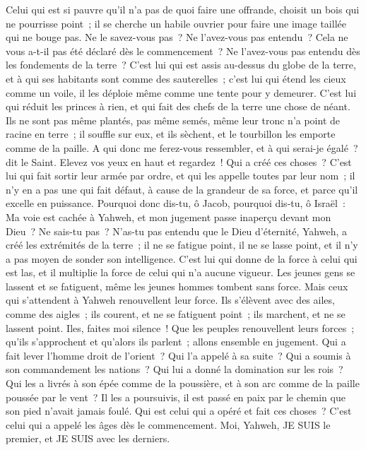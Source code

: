 \begin{multicols}{2}
Celui qui est si pauvre qu'il n'a pas de quoi faire une offrande, choisit un bois qui ne pourrisse point~; il se cherche un habile ouvrier pour faire une image taillée qui ne bouge pas.
Ne le savez-vous pas~? Ne l'avez-vous pas entendu~? Cela ne vous a-t-il pas été déclaré dès le commencement~? Ne l'avez-vous pas entendu dès les fondements de la terre~?
C'est lui qui est assis au-dessus du globe de la terre, et à qui ses habitants sont comme des sauterelles~; c'est lui qui étend les cieux comme un voile, il les déploie même comme une tente pour y demeurer.
C'est lui qui réduit les princes à rien, et qui fait des chefs de la terre une chose de néant.
Ils ne sont pas même plantés, pas même semés, même leur tronc n'a point de racine en terre~; il souffle sur eux, et ils sèchent, et le tourbillon les emporte comme de la paille.
A qui donc me ferez-vous ressembler, et à qui serai-je égalé~? dit le Saint.
Elevez vos yeux en haut et regardez~! Qui a créé ces choses~? C'est lui qui fait sortir leur armée par ordre, et qui les appelle toutes par leur nom~; il n'y en a pas une qui fait défaut, à cause de la grandeur de sa force, et parce qu'il excelle en puissance.
Pourquoi donc dis-tu, ô Jacob, pourquoi dis-tu, ô Israël~: Ma voie est cachée à Yahweh, et mon jugement passe inaperçu devant mon Dieu~?
Ne sais-tu pas~? N'as-tu pas entendu que le Dieu d'éternité, Yahweh, a créé les extrémités de la terre~; il ne se fatigue point, il ne se lasse point, et il n'y a pas moyen de sonder son intelligence.
C'est lui qui donne de la force à celui qui est las, et il multiplie la force de celui qui n'a aucune vigueur.
Les jeunes gens se lassent et se fatiguent, même les jeunes hommes tombent sans force.
Mais ceux qui s'attendent à Yahweh renouvellent leur force. Ils s'élèvent avec des ailes, comme des aigles~; ils courent, et ne se fatiguent point~; ils marchent, et ne se lassent point.
\VerseOne{}Iles, faites moi silence~! Que les peuples renouvellent leurs forces~; qu'ils s'approchent et qu'alors ils parlent~; allons ensemble en jugement.
Qui a fait lever l'homme droit de l'orient~? Qui l'a appelé à sa suite~? Qui a soumis à son commandement les nations~? Qui lui a donné la domination sur les rois~? Qui les a livrés à son épée comme de la poussière, et à son arc comme de la paille poussée par le vent~?
Il les a poursuivis, il est passé en paix par le chemin que son pied n'avait jamais foulé.
Qui est celui qui a opéré et fait ces choses~? C'est celui qui a appelé les âges dès le commencement. Moi, Yahweh, JE SUIS le premier, et JE SUIS avec les derniers.

\end{multicols}
